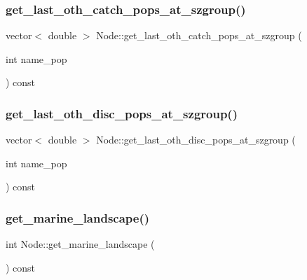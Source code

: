 \subsubsection{\texorpdfstring{get\_last\_oth\_catch\_pops\_at\_szgroup()}{get\_last\_oth\_catch\_pops\_at\_szgroup()}}
{\footnotesize\ttfamily vector$<$ double $>$ Node\+::get\+\_\+last\+\_\+oth\+\_\+catch\+\_\+pops\+\_\+at\+\_\+szgroup (\begin{DoxyParamCaption}\item[{int}]{name\+\_\+pop }\end{DoxyParamCaption}) const}

\mbox{\label{class_node_a364dfa5f71746f22e0493586159637a9}} 
\subsubsection{\texorpdfstring{get\_last\_oth\_disc\_pops\_at\_szgroup()}{get\_last\_oth\_disc\_pops\_at\_szgroup()}}
{\footnotesize\ttfamily vector$<$ double $>$ Node\+::get\+\_\+last\+\_\+oth\+\_\+disc\+\_\+pops\+\_\+at\+\_\+szgroup (\begin{DoxyParamCaption}\item[{int}]{name\+\_\+pop }\end{DoxyParamCaption}) const}

\mbox{\label{class_node_a2634dabdad22e482dd7e8ecc189e95b8}} 
\subsubsection{\texorpdfstring{get\_marine\_landscape()}{get\_marine\_landscape()}}
{\footnotesize\ttfamily int Node\+::get\+\_\+marine\+\_\+landscape (\begin{DoxyParamCaption}{ }\end{DoxyParamCaption}) const}

\mbox{\label{class_node_ac93d5a7437cf3247602454affd3a9241}} 
